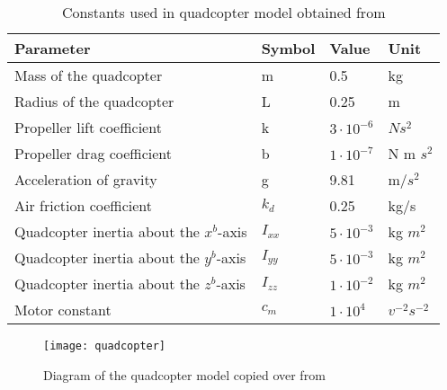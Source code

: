 \begin{table}[]
	\centering
	\caption{Constants used in quadcopter model obtained from \cite{Agudelo}}
	\label{btl:quadcopter model constants}
	\begin{tabular}{|l|l|l|l|}
		\hline
		Parameter                               & Symbol   & Value             & Unit           \\ \hline
		Mass of the quadcopter                  & m        & 0.5               & kg             \\
		Radius of the quadcopter                & L        & 0.25              & m              \\
		Propeller lift coefficient              & k        & $3 \cdot 10^{-6}$ & $Ns^2$        \\
		Propeller drag coefficient              & b        & $1 \cdot 10^{-7}$ & N m $s^2$      \\
		Acceleration of gravity                 & g        & 9.81              & m/$s^2$        \\
		Air friction coefficient                & $k_d$    & 0.25              & kg/s           \\
		Quadcopter inertia about the $x^b$-axis & $I_{xx}$ & $5 \cdot 10^{-3}$ & kg $m^2$       \\
		Quadcopter inertia about the $y^b$-axis & $I_{yy}$ & $5 \cdot 10^{-3}$ & kg $m^2$       \\
		Quadcopter inertia about the $z^b$-axis & $I_{zz}$ & $1 \cdot 10^{-2}$ & kg $m^2$       \\ 
		Motor constant                          & $c_m$    & $1 \cdot 10^{4}$  & $v^{-2}s^{-2}$ \\
		\hline
	\end{tabular}
\end{table}

\begin{figure}[h]
	\centering
	\texttt{[image: quadcopter]}
	\caption{Diagram of the quadcopter model copied over from  \cite{Agudelo}}
	\label{fig:quadcopter model diagram}
\end{figure}

